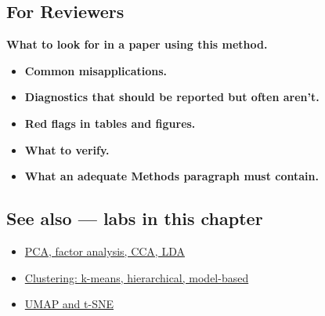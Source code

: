 \documentclass[
]{article}
\providecommand{\tightlist}{%
  \setlength{\itemsep}{0pt}\setlength{\parskip}{0pt}}
\begin{document}
\subsection{For Reviewers}\label{for-reviewers}

\textbf{What to look for in a paper using this method.}

\begin{itemize}
\tightlist
\item
  \textbf{Common misapplications.}
\item
  \textbf{Diagnostics that should be reported but often aren't.}
\item
  \textbf{Red flags in tables and figures.}
\item
  \textbf{What to verify.}
\item
  \textbf{What an adequate Methods paragraph must contain.}
\end{itemize}

\subsection{See also --- labs in this
chapter}\label{see-also-labs-in-this-chapter}

\begin{itemize}
\tightlist
\item
  \href{labs/lab-pca-factor-analysis-cca-lda.Rmd}{PCA, factor analysis,
  CCA, LDA}
\item
  \href{labs/lab-clustering-k-means-hierarchical-model-based.Rmd}{Clustering:
  k-means, hierarchical, model-based}
\item
  \href{labs/lab-umap-and-t-sne.Rmd}{UMAP and t-SNE}
\end{itemize}
\end{document}
